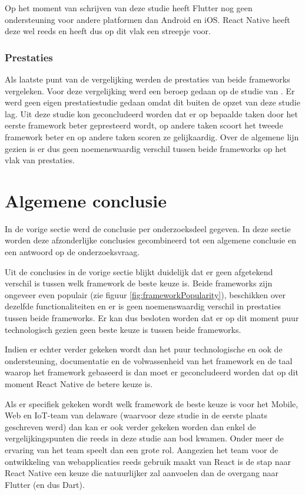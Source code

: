 Op het moment van schrijven van deze studie heeft Flutter nog geen ondersteuning voor andere platformen dan Android en iOS. React Native heeft deze wel reeds en heeft dus op dit vlak een streepje voor.

\subsubsection{Prestaties}

Als laatste punt van de vergelijking werden de prestaties van beide frameworks vergeleken. Voor deze vergelijking werd een beroep gedaan op de studie van \textcite{Fentaw2020}. Er werd geen eigen prestatiestudie gedaan omdat dit buiten de opzet van deze studie lag. Uit deze studie kon geconcludeerd worden dat er op bepaalde taken door het eerste framework beter gepresteerd wordt, op andere taken scoort het tweede framework beter en op andere taken scoren ze gelijkaardig. Over de algemene lijn gezien is er dus geen noemenswaardig verschil tussen beide frameworks op het vlak van prestaties.

\section{Algemene conclusie}
\label{sec:AlgemeneConclusie}

In de vorige sectie werd de conclusie per onderzoeksdeel gegeven. In deze sectie worden deze afzonderlijke conclusies gecombineerd tot een algemene conclusie en een antwoord op de onderzoeksvraag.

Uit de conclusies in de vorige sectie blijkt duidelijk dat er geen afgetekend verschil is tussen welk framework de beste keuze is. Beide frameworks zijn ongeveer even populair (zie figuur \ref{fig:frameworkPopularity}), beschikken over dezelfde functionaliteiten en er is geen noemenswaardig verschil in prestaties tussen beide frameworks. Er kan dus besloten worden dat er op dit moment puur technologisch gezien geen beste keuze is tussen beide frameworks.

Indien er echter verder gekeken wordt dan het puur technologische en ook de ondersteuning, documentatie en de volwassenheid van het framework en de taal waarop het framework gebaseerd is dan moet er geconcludeerd worden dat op dit moment React Native de betere keuze is. 

Als er specifiek gekeken wordt welk framework de beste keuze is voor het Mobile, Web en IoT-team van delaware (waarvoor deze studie in de eerste plaats geschreven werd) dan kan er ook verder gekeken worden dan enkel de vergelijkingspunten die reeds in deze studie aan bod kwamen. Onder meer de ervaring van het team speelt dan een grote rol. Aangezien het team voor de ontwikkeling van webapplicaties reeds gebruik maakt van React is de stap naar React Native een keuze die natuurlijker zal aanvoelen dan de overgang naar Flutter (en dus Dart). 

